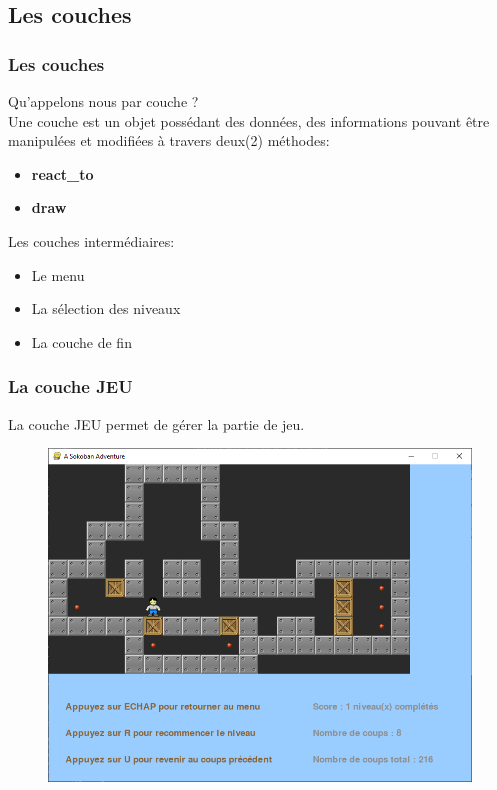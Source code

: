 \documentclass[13pt]{beamer}
\begin{document}
\subsection{Les couches}
\begin{frame}
    \frametitle{Les couches}
    Qu'appelons nous par couche ? \\
    \medskip
    Une couche est un objet possédant des données,
    des informations pouvant être manipulées et modifiées à travers deux(2) méthodes:
    \begin{itemize}
        \item \textbf{react\_to}
        \item \textbf{draw}
    \end{itemize}
	\medskip
    Les couches intermédiaires:
    \begin{itemize}
        \item Le menu
        \item La sélection des niveaux
        \item La couche de fin
    \end{itemize}

\end{frame}

\begin{frame}
    \frametitle{La couche JEU}
    La couche JEU permet de gérer la partie de jeu.
    \begin{figure}
        \includegraphics[scale=0.4]{images/Capture_104539.png}
    \end{figure}
\end{frame}
\end{document}
